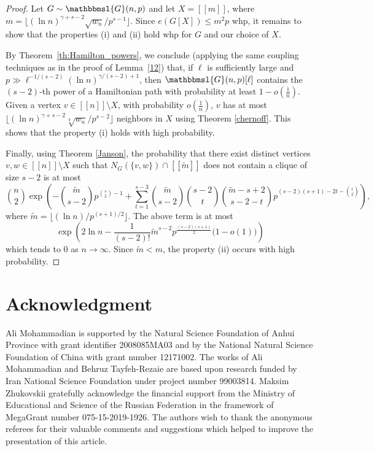 \documentclass[hidelinks, 11pt]{article}
\theoremstyle{plain}
\theoremstyle{definition}
\begin{document}
\begin{proof}
Let $G\sim\mathbbmsl{G}(n, p)$ and  let  $X=[\![m]\!]$, where $m=\lfloor(\ln n)^{\gamma+s-2}\sqrt{w_n}/p^{s-1}\rfloor$.   Since   $e(G[X])\leq m^2p$ whp, it remains to show that  the properties   (i) and (ii) hold  whp  for $G$ and our choice of $X$.


By Theorem~\ref{th:Hamilton_powers}, we   conclude (applying the same coupling techniques as in the proof of Lemma~\ref{12})  that,   if    $\ell$ is sufficiently large and     $p\gg\ell^{-1/(s-2)}(\ln n)^{\gamma/(s-2)+1}$, then $\mathbbmsl{G}(n,p)[\ell]$ contains the $(s-2)$-th power of a Hamiltonian path with probability at least $1-o(\tfrac{1}{n})$. Given a vertex $v\in[\![n]\!]\setminus X$, with probability $o(\tfrac{1}{n})$, $v$ has  at most  $\lfloor(\ln n)^{\gamma+s-2}\sqrt[4]{w_n}/p^{s-2}\rfloor$ neighbors in $X$ using  Theorem \ref{chernoff}. This shows that  the property     (i) holds with
high probability.


Finally, using   Theorem \ref{Janson}, the probability that  there exist distinct  vertices  $v,w\in[\![n]\!]\setminus X$ such that $N_G(\{v, w\})\cap [\![\widetilde m]\!]$ does not   contain  a clique of size $s-2$   is at most
$${n\choose 2}\exp\left(-{\widetilde m\choose s-2}p^{{s\choose 2}-1}+\sum_{t=1}^{s-3}{\widetilde m\choose s-2}{s-2\choose t}{\widetilde m-s+2\choose s-2-t}p^{(s-2)(s+1)-2t-{t\choose 2}}\right),$$ where $\widetilde{m}=\lfloor (\ln n)/p^{(s+1)/2}\rfloor$. The above term is at most
$$\exp\left(2\ln n-\frac{1}{(s-2)!}\widetilde m^{s-2}p^{\frac{(s-2)(s+1)}{2}}\big(1-o(1)\big)\right)$$ which tends to $0$ as $n\to\infty$. Since $\widetilde{m}<m$,  the property  (ii) occurs  with
high probability.
\end{proof}



\section*{Acknowledgment}


Ali Mohammadian  is supported by the    Natural Science Foundation of Anhui Province  with  grant identifier 2008085MA03 and by the National Natural Science Foundation of China with  grant number 12171002.
The works   of Ali Mohammadian  and  Behruz Tayfeh-Rezaie  are  based upon research funded by Iran  National  Science Foundation   under project number  99003814.
Maksim Zhukovskii gratefully acknowledge the financial support from the Ministry of Educational and Science of the Russian Federation in the framework of MegaGrant number  075-15-2019-1926.
The authors wish  to thank the anonymous referees for their valuable comments and  suggestions which helped to improve the presentation of this article.
\end{document}
